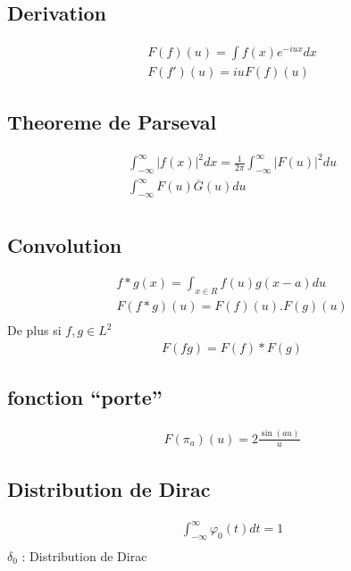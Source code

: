 \documentclass[a4paper,11pt]{article}
\begin{document}
\subsection{Derivation}
\begin{align*}
  F(f)(u) = \int f(x)e^{-iux} dx\\
  F(f')(u) = i u F(f)(u)
\end{align*}

\subsection{Theoreme de Parseval}

\begin{align*}
  \int_{-\infty}^{\infty} |f(x)|^2 dx = \frac{1}{2\pi} \int_{-\infty}^{\infty} |F(u)|^2 du\\
  \int_{-\infty}^{\infty} F(u)\overline{G}(u) du\\
\end{align*}

\subsection{Convolution}

\begin{align*}
  f * g(x) = \int_{x \in R} f(u) g(x - a) du\\
  F(f * g) (u) = F(f)(u) . F(g)(u)\\
\end{align*}
De plus si $f,g \in L^2$
\begin{align*}
  F(fg) = F(f) * F(g)
\end{align*}

\subsection{fonction ``porte''}

\begin{align*}
  F(\pi_a)(u) = 2 \frac{\sin(au)}{u}
\end{align*}

\subsection{Distribution de Dirac}
\begin{align*}
  \int_{-\infty}^{\infty} \varphi_0(t)dt = 1\\
 \end{align*}
$\delta_0 $ : Distribution de Dirac
\end{document}
